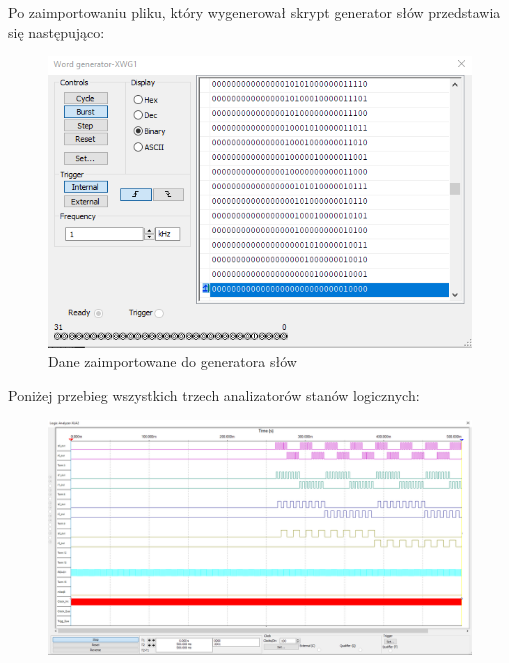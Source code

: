 \documentclass[a4paper]{article}
\begin{document}
\pagebreak
Po zaimportowaniu pliku, który wygenerował skrypt generator słów przedstawia się następująco:
\begin{figure}[H]
    \centering

    \includegraphics{setter_test_word_generator.png}
    \caption{Dane zaimportowane do generatora słów}
\end{figure}

\pagebreak
Poniżej przebieg wszystkich trzech analizatorów stanów logicznych:
\begin{figure}[H]
    \centering
    \includegraphics[width=\textwidth]{component_test_logic_analyzer_xla2_setter.png}
\end{figure}
\end{document}

